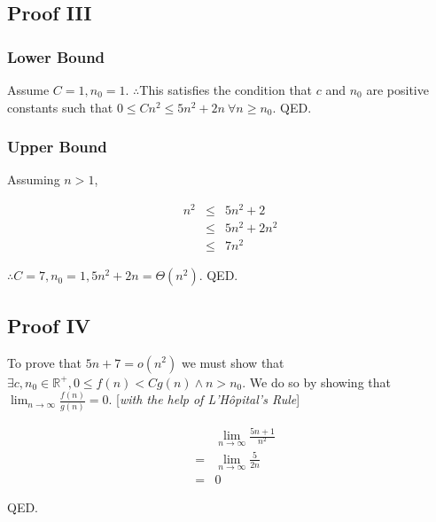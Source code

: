 \documentclass{article}
\begin{document}
\subsection{Proof III}
\subsubsection{Lower Bound}
Assume $C = 1, n_0 = 1$. $\therefore $This satisfies the condition that
$c$ and $n_0$ are positive constants such that $0 \leq Cn^2 \leq 5n^2 + 2n \ \forall n \geq n_0$. QED.

\subsubsection{Upper Bound}
Assuming $n > 1$,

\begin{eqnarray}
n^2 & \leq & 5n^2 + 2 \\
& \leq & 5n^2 + 2n^2 \\
& \leq & 7n^2
\end{eqnarray}

$\therefore C = 7, n_0 = 1, 5n^2 + 2n = \Theta(n^2)$. QED.

\subsection{Proof IV}
To prove that $5n+7 = o(n^2)$ we must show that $\exists c, n_0 \in \mathbb{R}^+, 0 \leq f(n) < Cg(n) \wedge n > n_0$. We do so by showing that $\lim _{n \rightarrow \infty} \frac{f(n)}{g(n)} = 0$. [\textit{with the help of L'H\^{o}pital's Rule}]

\begin{eqnarray}
& & \lim _{n \rightarrow \infty} \frac{5n+ 1}{n^2} \\
& = & \lim _{n \rightarrow \infty} \frac{5}{2n} \\
& = & 0
\end{eqnarray}

QED.
\end{document}
